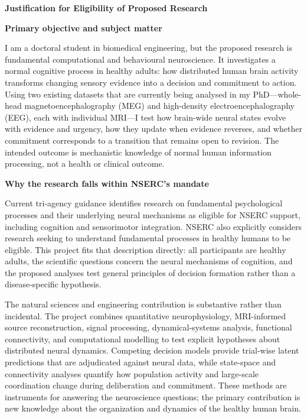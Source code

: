 \documentclass[12pt,letterpaper]{article}
\newcommand{\eligsection}[1]{\Needspace{2\baselineskip}\vspace{3pt}\noindent\textbf{#1}\par\vspace{0pt}}
\begin{document}
\begin{center}
\textbf{Justification for Eligibility of Proposed Research}
\end{center}
\vspace{-4pt}

\eligsection{Primary objective and subject matter}
I am a doctoral student in biomedical engineering, but the proposed research is fundamental computational and behavioural neuroscience. It investigates a normal cognitive process in healthy adults: how distributed human brain activity transforms changing sensory evidence into a decision and commitment to action. Using two existing datasets that are currently being analysed in my PhD---whole-head magnetoencephalography (MEG) and high-density electroencephalography (EEG), each with individual MRI---I test how brain-wide neural states evolve with evidence and urgency, how they update when evidence reverses, and whether commitment corresponds to a transition that remains open to revision. The intended outcome is mechanistic knowledge of normal human information processing, not a health or clinical outcome.

\eligsection{Why the research falls within NSERC's mandate}
Current tri-agency guidance identifies research on fundamental psychological processes and their underlying neural mechanisms as eligible for NSERC support, including cognition and sensorimotor integration. NSERC also explicitly considers research seeking to understand fundamental processes in healthy humans to be eligible. This project fits that description directly: all participants are healthy adults, the scientific questions concern the neural mechanisms of cognition, and the proposed analyses test general principles of decision formation rather than a disease-specific hypothesis.

The natural sciences and engineering contribution is substantive rather than incidental. The project combines quantitative neurophysiology, MRI-informed source reconstruction, signal processing, dynamical-systems analysis, functional connectivity, and computational modelling to test explicit hypotheses about distributed neural dynamics. Competing decision models provide trial-wise latent predictions that are adjudicated against neural data, while state-space and connectivity analyses quantify how population activity and large-scale coordination change during deliberation and commitment. These methods are instruments for answering the neuroscience questions; the primary contribution is new knowledge about the organization and dynamics of the healthy human brain.
\end{document}
